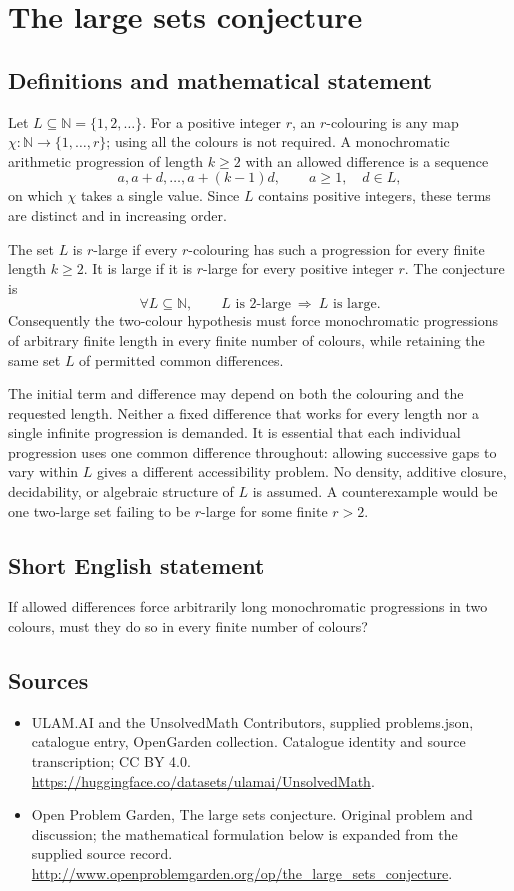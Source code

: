\documentclass[11pt,a4paper]{article}
\begin{document}
\section*{The large sets conjecture}\label{statement}

\subsection{Definitions and mathematical statement}
Let $L\subseteq\mathbb N=\{1,2,\ldots\}$. For a positive integer $r$,
an $r$-colouring is any map $\chi:\mathbb N\to\{1,\ldots,r\}$; using
all the colours is not required. A monochromatic arithmetic progression
of length $k\ge2$ with an allowed difference is a sequence
\[
 a,a+d,\ldots,a+(k-1)d,\qquad a\ge1,\quad d\in L,
\]
on which $\chi$ takes a single value. Since $L$ contains positive integers,
these terms are distinct and in increasing order.

The set $L$ is $r$-large if every $r$-colouring has such a progression
for every finite length $k\ge2$. It is large if it is $r$-large for every
positive integer $r$.
The conjecture is
\[
 \forall L\subseteq\mathbb N,\qquad
 L\text{ is }2\text{-large}\ \Longrightarrow\ L\text{ is large}.
\]
Consequently the two-colour hypothesis must force monochromatic
progressions of arbitrary finite length in every finite number of colours,
while retaining the same set $L$ of permitted common differences.

The initial term and difference may depend on both the colouring and the
requested length. Neither a fixed difference that works for every length
nor a single infinite progression is demanded. It is essential that each
individual progression uses one common difference throughout: allowing
successive gaps to vary within $L$ gives a different accessibility problem.
No density, additive closure, decidability, or algebraic structure of $L$
is assumed. A counterexample would be one two-large set failing to be
$r$-large for some finite $r>2$.
\subsection{Short English statement}
If allowed differences force arbitrarily long monochromatic progressions in two colours, must they do so in every finite number of colours?
\subsection{Sources}
\begin{itemize}
\item[S1] ULAM.AI and the UnsolvedMath Contributors, supplied problems.json, catalogue entry, OpenGarden collection. Catalogue identity and source transcription; CC BY 4.0.
\url{https://huggingface.co/datasets/ulamai/UnsolvedMath}.
\item[S2] Open Problem Garden, The large sets conjecture. Original problem and discussion; the mathematical formulation below is expanded from the supplied source record.
\url{http://www.openproblemgarden.org/op/the_large_sets_conjecture}.
\end{itemize}
\end{document}
